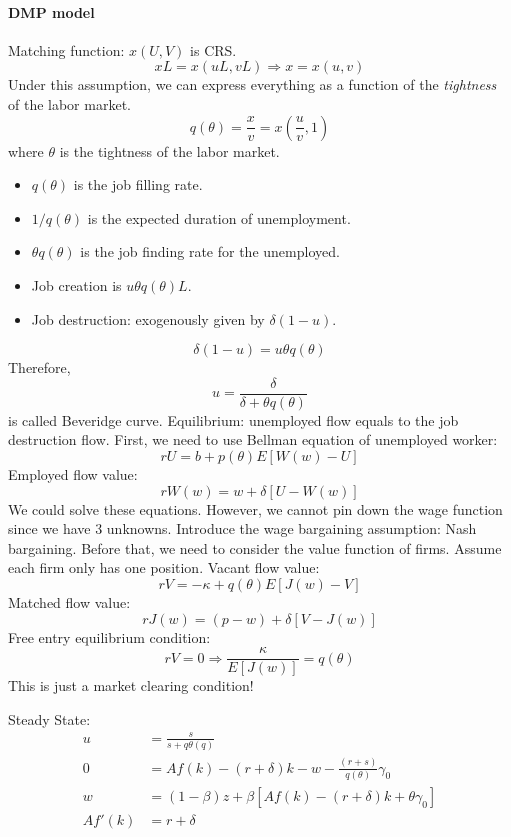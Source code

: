 \documentclass[11pt,a4paper]{article}
\begin{document}
\paragraph{DMP model}
Matching function: $x(U,V)$ is CRS. 
$$ xL = x(uL,vL) \Rightarrow x= x(u,v) $$
Under this assumption, we can express everything as a function of the \textit{tightness} of the labor market. 
$$ q(\theta) = \frac{x}{v} = x\left(\frac{u}{v},1\right) $$ 
where $\theta$ is the tightness of the labor market. 
\begin{itemize}
  \item $q(\theta)$ is the job filling rate.
  \item $1/q(\theta)$ is the expected duration of unemployment.
  \item $\theta q(\theta)$ is the job finding rate for the unemployed.
  \item Job creation is $u \theta q(\theta )L$.
  \item Job destruction: exogenously given by $\delta (1-u)$.
\end{itemize}
$$ \delta(1-u) = u\theta q(\theta) $$
Therefore, $$ u = \frac{\delta}{\delta + \theta q(\theta)} $$
is called Beveridge curve. 
Equilibrium: unemployed flow equals to the job destruction flow.
First, we need to use Bellman equation of unemployed worker: 
$$ r U = b + p(\theta)E[W(w)-U] $$
Employed flow value: $$ r W(w) = w +\delta [U-W(w)] $$
We could solve these equations. However, we cannot pin down the wage function since we have 3 unknowns. 
Introduce the wage bargaining assumption: Nash bargaining. Before that, we need to consider the value function of firms. Assume each firm only has one position. Vacant flow value:
$$ r V = -\kappa + q(\theta)E[J(w)-V] $$
Matched flow value:
$$ r J(w) = (p-w) + \delta [V-J(w)] $$
Free entry equilibrium condition: $$ rV=0 \Rightarrow \frac{\kappa }{E[J(w)]} = q(\theta)$$
This is just a market clearing condition! 

Steady State: 
\begin{align}
  u &= \frac{s}{s+q\theta(q)}\\ 
  0 &= A f(k) - (r+\delta)k - w -\frac{(r+s)}{q(\theta)}\gamma_0 \\ 
  w &= (1-\beta )z + \beta [Af(k)-(r+\delta)k+\theta \gamma_0]\\
  Af'(k) &= r+\delta
\end{align}
\end{document}
